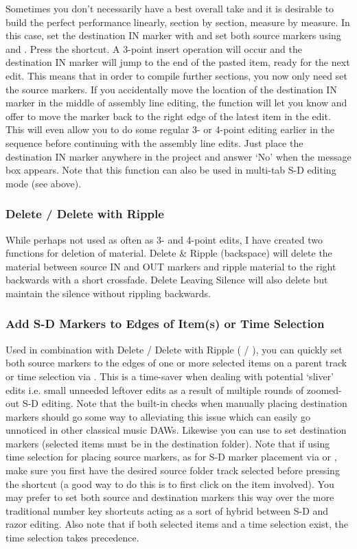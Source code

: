 \documentclass[10pt,american]{article}
\begin{document}
Sometimes you don't necessarily have a best overall take and it is desirable to
build the perfect performance linearly, section by section, measure by measure.
In this case, set the destination IN marker with  and set both source
markers using  and . Press the  shortcut. A 3-point
insert operation will occur and the destination IN marker will jump to the end
of the pasted item, ready for the next edit. This means that in order to compile
further sections, you now only need set the source markers. If you accidentally
move the location of the destination IN marker in the middle of assembly line
editing, the function will let you know and offer to move the marker back to the
right edge of the latest item in the edit. This will even allow you to do some
regular 3- or 4-point editing earlier in the sequence before continuing with the
assembly line edits. Just place the destination IN marker anywhere in the
project and answer `No' when the message box appears. Note that this function
can also be used in multi-tab S-D editing mode (see above).

\subsubsection{Delete / Delete with Ripple}

While perhaps not used as often as 3- and 4-point edits, I have created two
functions for deletion of material. Delete \& Ripple \keys{\backspace}
(backspace) will delete the material between source IN and OUT markers and
ripple material to the right backwards with a short crossfade. Delete Leaving
Silence \keys{\ctrl+\backspace} will also delete but maintain the silence
without rippling backwards.

\subsubsection{Add S-D Markers to Edges of Item(s) or Time Selection}

Used in combination with Delete / Delete with Ripple (\keys{\ctrl+\backspace} /
\keys{\backspace}), you can quickly set both source markers to the edges of one
or more selected items on a parent track or time selection via . This
is a time-saver when dealing with potential `sliver' edits i.e. small unneeded
leftover edits as a result of multiple rounds of zoomed-out S-D editing. Note
that the built-in checks when manually placing destination markers should go
some way to alleviating this issue which can easily go unnoticed in other
classical music DAWs. Likewise you can use  to set destination
markers (selected items must be in the destination folder). Note that if using
time selection for placing source markers, as for S-D marker placement via
 or , make sure you first have the desired source folder track
selected before pressing the shortcut (a good way to do this is to first click
on the item involved). You may prefer to set both source and destination markers
this way over the more traditional number key shortcuts acting as a sort of
hybrid between S-D and razor editing. Also note that if both selected items and
a time selection exist, the time selection takes precedence.
\end{document}

